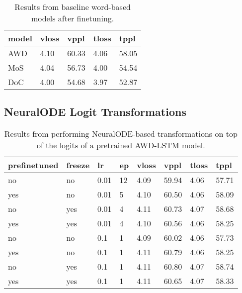 \begin{table}[]
\centering
\caption{Results from baseline word-based models after finetuning.}
\begin{tabular}{|l|l|l|l|l|}
\hline
\textbf{model} & \textbf{vloss} & \textbf{vppl}  & \textbf{tloss} & \textbf{tppl}  \\ \hline
AWD   & 4.10  & 60.33 & 4.06  & 58.05 \\ \hline
MoS   & 4.04  & 56.73 & 4.00  & 54.54 \\ \hline
DoC   & 4.00  & 54.68 & 3.97  & 52.87 \\ \hline
\end{tabular}
\label{table:experiments:baselines_word_finetuned}
\end{table}

\subsection{NeuralODE Logit Transformations}

\begin{table}[]
\centering
\caption{Results from performing NeuralODE-based transformations on top of the logits of a pretrained AWD-LSTM model.}
\begin{tabular}{|l|l|l|l|l|l|l|l|}
\hline
\textbf{prefinetuned} & \textbf{freeze} & \textbf{lr} & \textbf{ep} & \textbf{vloss} & \textbf{vppl} & \textbf{tloss} & \textbf{tppl} \\ \hline
no        & no        & 0.01      & 12        & 4.09      & 59.94     & 4.06      & 57.71 \\ \hline
yes       & no        & 0.01      & 5         & 4.10      & 60.50     & 4.06      & 58.09 \\ \hline
no        & yes       & 0.01      & 4         & 4.11      & 60.73     & 4.07      & 58.68 \\ \hline
yes       & yes       & 0.01      & 4         & 4.10      & 60.56     & 4.06      & 58.25 \\ \hline
no        & no        & 0.1       & 1         & 4.09      & 60.02     & 4.06      & 57.73 \\ \hline
yes       & no        & 0.1       & 1         & 4.11      & 60.79     & 4.06      & 58.25 \\ \hline
no        & yes       & 0.1       & 1         & 4.11      & 60.80     & 4.07      & 58.74 \\ \hline
yes       & yes       & 0.1       & 1         & 4.11      & 60.65     & 4.07      & 58.33 \\ \hline
\end{tabular}
\end{table}


